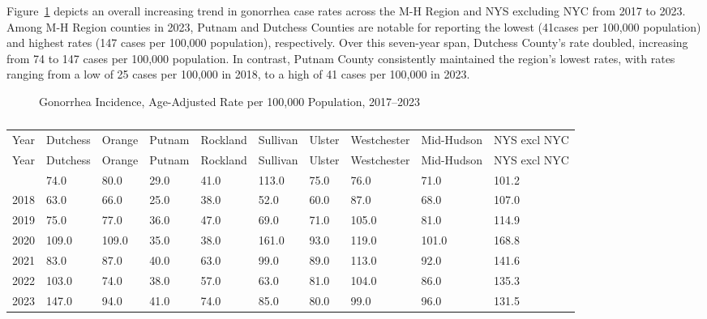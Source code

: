 \documentclass[
  english,
  letterpaper,
]{report}
\begin{document}
Figure~\ref{fig-gono-incident-aar} depicts an overall increasing trend
in gonorrhea case rates across the M-H Region and NYS excluding NYC from
2017 to 2023. Among M-H Region counties in 2023, Putnam and Dutchess
Counties are notable for reporting the lowest (41cases per 100,000
population) and highest rates (147 cases per 100,000 population),
respectively. Over this seven-year span, Dutchess County's rate doubled,
increasing from 74 to 147 cases per 100,000 population. In contrast,
Putnam County consistently maintained the region's lowest rates, with
rates ranging from a low of 25 cases per 100,000 in 2018, to a high of
41 cases per 100,000 in 2023.

\begin{figure}


\caption{\label{fig-gono-incident-aar}Gonorrhea Incidence, Age-Adjusted
Rate per 100,000 Population, 2017--2023}

\end{figure}%

\begin{longtable}[]{@{}llllllllll@{}}

\caption{\label{tbl-gono-incident-aar}Gonorrhea Incidence, Age-Adjusted
Rate per 100,000 Population, 2017--2023}

\tabularnewline

\caption{}\label{T_3acca}\tabularnewline
\toprule\noalign{}
Year & Dutchess & Orange & Putnam & Rockland & Sullivan & Ulster &
Westchester & Mid-Hudson & NYS excl NYC \\
\midrule\noalign{}
\endfirsthead
\toprule\noalign{}
Year & Dutchess & Orange & Putnam & Rockland & Sullivan & Ulster &
Westchester & Mid-Hudson & NYS excl NYC \\
\midrule\noalign{}
\endhead
\bottomrule\noalign{}
\endlastfoot
2017 & 74.0 & 80.0 & 29.0 & 41.0 & 113.0 & 75.0 & 76.0 & 71.0 & 101.2 \\
2018 & 63.0 & 66.0 & 25.0 & 38.0 & 52.0 & 60.0 & 87.0 & 68.0 & 107.0 \\
2019 & 75.0 & 77.0 & 36.0 & 47.0 & 69.0 & 71.0 & 105.0 & 81.0 & 114.9 \\
2020 & 109.0 & 109.0 & 35.0 & 38.0 & 161.0 & 93.0 & 119.0 & 101.0 &
168.8 \\
2021 & 83.0 & 87.0 & 40.0 & 63.0 & 99.0 & 89.0 & 113.0 & 92.0 & 141.6 \\
2022 & 103.0 & 74.0 & 38.0 & 57.0 & 63.0 & 81.0 & 104.0 & 86.0 &
135.3 \\
2023 & 147.0 & 94.0 & 41.0 & 74.0 & 85.0 & 80.0 & 99.0 & 96.0 & 131.5 \\

\end{longtable}
\end{document}
